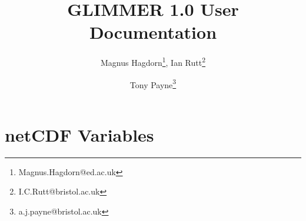 \newcommand{\dir}{ug}

\pagestyle{myheadings}


\title{GLIMMER 1.0 User Documentation}
\author{Magnus Hagdorn\thanks{Magnus.Hagdorn@ed.ac.uk}, Ian
Rutt\thanks{I.C.Rutt@bristol.ac.uk} \and Tony Payne\thanks{a.j.payne@bristol.ac.uk}}
\maketitle
\tableofcontents
\newpage


\appendix
\section{netCDF Variables}

